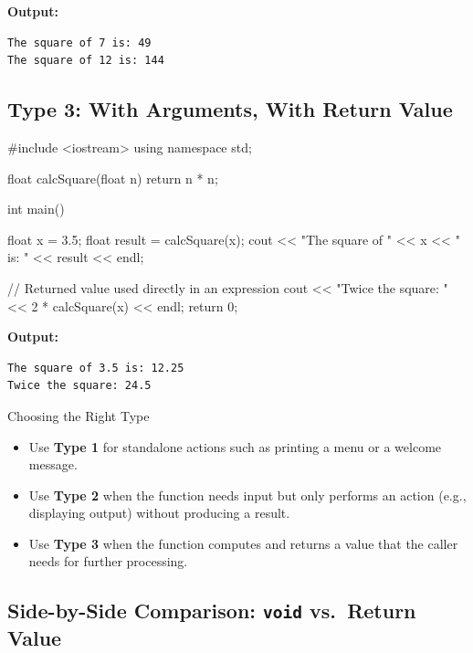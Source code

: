 \noindent\textbf{Output:}
\begin{verbatim}
The square of 7 is: 49
The square of 12 is: 144
\end{verbatim}

\subsection{Type 3: With Arguments, With Return Value}

\begin{cppcode}
#include <iostream>
using namespace std;

float calcSquare(float n)
{
    return n * n;
}

int main()
{
    float x = 3.5;
    float result = calcSquare(x);
    cout << "The square of " << x
         << " is: " << result << endl;

    // Returned value used directly in an expression
    cout << "Twice the square: "
         << 2 * calcSquare(x) << endl;
    return 0;
}
\end{cppcode}

\noindent\textbf{Output:}
\begin{verbatim}
The square of 3.5 is: 12.25
Twice the square: 24.5
\end{verbatim}

\begin{conceptbox}{Choosing the Right Type}
\begin{itemize}
    \item Use \textbf{Type 1} for standalone actions such as printing a menu
          or a welcome message.
    \item Use \textbf{Type 2} when the function needs input but only performs
          an action (e.g., displaying output) without producing a result.
    \item Use \textbf{Type 3} when the function computes and returns a value
          that the caller needs for further processing.
\end{itemize}
\end{conceptbox}

\subsection{Side-by-Side Comparison: \texttt{void} vs.\ Return Value}

